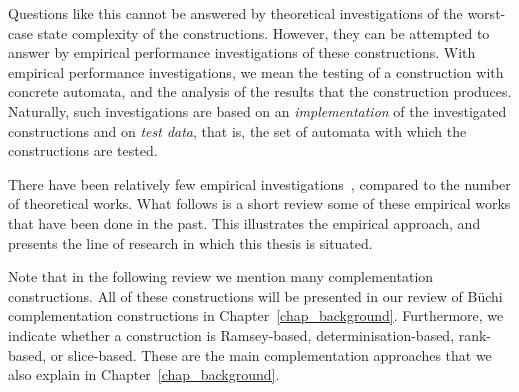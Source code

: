 
Questions like this cannot be answered by theoretical investigations of the worst-case state complexity of the constructions. However, they can be attempted to answer by empirical performance investigations of these constructions. With empirical performance investigations, we mean the testing of a construction with concrete automata, and the analysis of the results that the construction produces. Naturally, such investigations are based on an \textit{implementation} of the investigated constructions and on \textit{test data}, that is, the set of automata with which the constructions are tested.

There have been relatively few empirical investigations~\cite{2011_tsai}, compared to the number of theoretical works. What follows is a short review some of these empirical works that have been done in the past. This illustrates the empirical approach, and presents the line of research in which this thesis is situated.

Note that in the following review we mention many complementation constructions. All of these constructions will be presented in our review of Büchi complementation constructions in Chapter~\ref{chap_background}. Furthermore, we indicate whether a construction is Ramsey-based, determinisation-based, rank-based, or slice-based. These are the main complementation approaches that we also explain in Chapter~\ref{chap_background}. 

